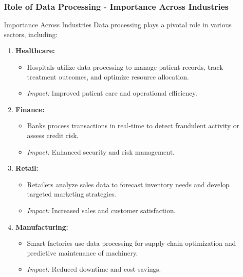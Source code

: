\documentclass[aspectratio=169]{beamer}
\begin{document}
\begin{frame}[fragile]
    \frametitle{Role of Data Processing - Importance Across Industries}
    \begin{block}{Importance Across Industries}
        Data processing plays a pivotal role in various sectors, including:
        \begin{enumerate}
            \item \textbf{Healthcare:}
                \begin{itemize}
                    \item Hospitals utilize data processing to manage patient records, track treatment outcomes, and optimize resource allocation.
                    \item \textit{Impact:} Improved patient care and operational efficiency.
                \end{itemize}
            \item \textbf{Finance:}
                \begin{itemize}
                    \item Banks process transactions in real-time to detect fraudulent activity or assess credit risk.
                    \item \textit{Impact:} Enhanced security and risk management.
                \end{itemize}
            \item \textbf{Retail:}
                \begin{itemize}
                    \item Retailers analyze sales data to forecast inventory needs and develop targeted marketing strategies.
                    \item \textit{Impact:} Increased sales and customer satisfaction.
                \end{itemize}
            \item \textbf{Manufacturing:}
                \begin{itemize}
                    \item Smart factories use data processing for supply chain optimization and predictive maintenance of machinery.
                    \item \textit{Impact:} Reduced downtime and cost savings.
                \end{itemize}
        \end{enumerate}
    \end{block}
\end{frame}
\end{document}
